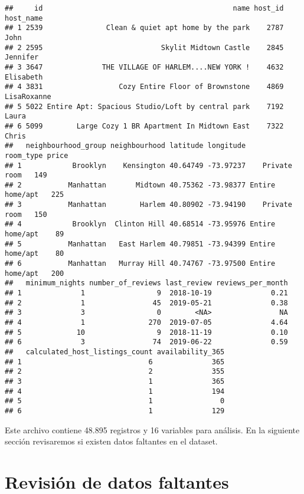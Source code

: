 \documentclass[
]{book}
\begin{document}
\begin{verbatim}
##     id                                             name host_id   host_name
## 1 2539               Clean & quiet apt home by the park    2787        John
## 2 2595                            Skylit Midtown Castle    2845    Jennifer
## 3 3647              THE VILLAGE OF HARLEM....NEW YORK !    4632   Elisabeth
## 4 3831                  Cozy Entire Floor of Brownstone    4869 LisaRoxanne
## 5 5022 Entire Apt: Spacious Studio/Loft by central park    7192       Laura
## 6 5099        Large Cozy 1 BR Apartment In Midtown East    7322       Chris
##   neighbourhood_group neighbourhood latitude longitude       room_type price
## 1            Brooklyn    Kensington 40.64749 -73.97237    Private room   149
## 2           Manhattan       Midtown 40.75362 -73.98377 Entire home/apt   225
## 3           Manhattan        Harlem 40.80902 -73.94190    Private room   150
## 4            Brooklyn  Clinton Hill 40.68514 -73.95976 Entire home/apt    89
## 5           Manhattan   East Harlem 40.79851 -73.94399 Entire home/apt    80
## 6           Manhattan   Murray Hill 40.74767 -73.97500 Entire home/apt   200
##   minimum_nights number_of_reviews last_review reviews_per_month
## 1              1                 9  2018-10-19              0.21
## 2              1                45  2019-05-21              0.38
## 3              3                 0        <NA>                NA
## 4              1               270  2019-07-05              4.64
## 5             10                 9  2018-11-19              0.10
## 6              3                74  2019-06-22              0.59
##   calculated_host_listings_count availability_365
## 1                              6              365
## 2                              2              355
## 3                              1              365
## 4                              1              194
## 5                              1                0
## 6                              1              129
\end{verbatim}

Este archivo contiene 48.895 registros y 16 variables para análisis. En la siguiente sección revisaremos si existen datos faltantes en el dataset.

\hypertarget{revisiuxf3n-de-datos-faltantes}{%
\section{Revisión de datos faltantes}\label{revisiuxf3n-de-datos-faltantes}}
\end{document}
